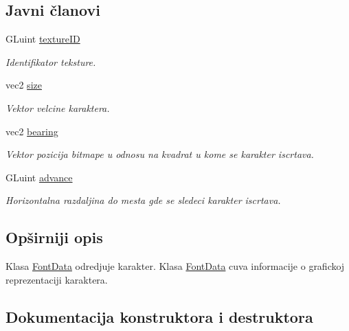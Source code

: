 \subsection*{Javni članovi}
\begin{DoxyCompactItemize}
\item 
G\+Luint \hyperlink{classfont_1_1FontData_ad91fcb854ec0a18c84d315c5c70f0eb5}{texture\+ID}
\begin{DoxyCompactList}\small\item\em Identifikator teksture. \end{DoxyCompactList}\item 
vec2 \hyperlink{classfont_1_1FontData_a783ccdb54f0b3319c31c31bd8acf6111}{size}
\begin{DoxyCompactList}\small\item\em Vektor velcine karaktera. \end{DoxyCompactList}\item 
vec2 \hyperlink{classfont_1_1FontData_a08a463faed8b16ed9fd55f94228a44d4}{bearing}
\begin{DoxyCompactList}\small\item\em Vektor pozicija bitmape u odnosu na kvadrat u kome se karakter iscrtava. \end{DoxyCompactList}\item 
G\+Luint \hyperlink{classfont_1_1FontData_a837cf15ff5ef8e10d0aa6132bff4b676}{advance}
\begin{DoxyCompactList}\small\item\em Horizontalna razdaljina do mesta gde se sledeci karakter iscrtava. \end{DoxyCompactList}\end{DoxyCompactItemize}


\subsection{Opširniji opis}
Klasa \hyperlink{classfont_1_1FontData}{Font\+Data} odredjuje karakter. Klasa \hyperlink{classfont_1_1FontData}{Font\+Data} cuva informacije o grafickoj reprezentaciji karaktera. 

\subsection{Dokumentacija konstruktora i destruktora}
\mbox{\label{classfont_1_1FontData_a6c2af608dc84f16f1fc29fb30a340f51}} 
